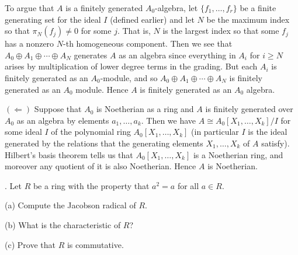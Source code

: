 \documentclass[11pt]{article}
\begin{document}
To argue that $A$ is a finitely generated $A_0$-algebra, let $\{f_1,\ldots, f_r\}$ be a finite generating set for the ideal $I$ (defined earlier) and let $N$ be the maximum index so that $\pi_N(f_j) \neq 0$ for some $j$. That is, $N$ is the largest index so that some $f_j$ has a nonzero $N$-th homogeneous component. Then we see that $A_0\oplus A_1\oplus\cdots\oplus A_N$ generates $A$ as an algebra since everything in $A_i$ for $i\ge N$ arises by multiplication of lower degree terms in the grading. But each $A_i$ is finitely generated as an $A_0$-module, and so $A_0\oplus A_1\oplus\cdots\oplus A_N$ is finitely generated as an $A_0$ module. Hence $A$ is finitely generated as an $A_0$ algebra.









$(\Leftarrow)$ Suppose that $A_0$ is Noetherian as a ring and $A$ is finitely generated over $A_0$ as an algebra by elements $a_1,\ldots, a_k$. Then we have $A\cong A_0[X_1,\ldots, X_k]/I$ for some ideal $I$ of the polynomial ring $A_0[X_1,\ldots, X_k]$ (in particular $I$ is the ideal generated by the relations that the generating elements $X_1,\ldots, X_k$ of $A$ satisfy). Hilbert's basis theorem tells us that $A_0[X_1,\ldots, X_k]$ is a Noetherian ring, and moreover any quotient of it is also Noetherian. Hence $A$ is Noetherian. 

 
. Let $R$ be a ring with the property that $a^2 = a$ for all $a\in R$.

(a) Compute the Jacobson radical of $R$.

(b) What is the characteristic of $R$?

(c) Prove that $R$ is commutative.
\end{document}
